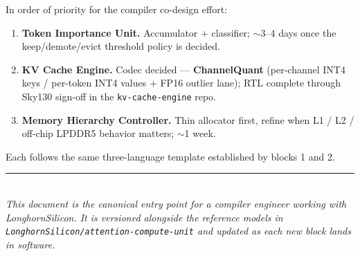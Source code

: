 \documentclass[11pt]{article}
\begin{document}
In order of priority for the compiler co-design effort:

\begin{enumerate}
\item \textbf{Token Importance Unit.} Accumulator + classifier;
      $\sim$3--4 days once the keep/demote/evict threshold policy
      is decided.
\item \textbf{KV Cache Engine.} Codec decided --- \textbf{ChannelQuant}
      (per-channel INT4 keys / per-token INT4 values + FP16 outlier lane);
      RTL complete through Sky130 sign-off in the \texttt{kv-cache-engine} repo.
\item \textbf{Memory Hierarchy Controller.} Thin allocator first,
      refine when L1 / L2 / off-chip LPDDR5 behavior matters; $\sim$1 week.
\end{enumerate}

Each follows the same three-language template established by blocks
1 and 2.

\vspace{0.5in}
\noindent\rule{\textwidth}{0.4pt}\\
\noindent\small\textit{This document is the canonical entry point
for a compiler engineer working with LonghornSilicon. It is
versioned alongside the reference models in
\texttt{LonghornSilicon/attention-compute-unit} and updated
as each new block lands in software.}
\end{document}
